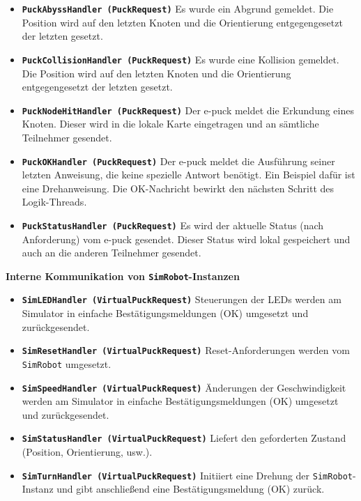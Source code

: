 \documentclass[10pt,a4paper]{article}
\begin{document}
			\begin{itemize}
				\item \textbf{\texttt{PuckAbyssHandler (PuckRequest)}} Es wurde ein Abgrund gemeldet. Die Position wird auf den letzten Knoten und die
					Orientierung entgegengesetzt der letzten gesetzt.
				\item \textbf{\texttt{PuckCollisionHandler (PuckRequest)}} Es wurde eine Kollision gemeldet. Die Position wird auf den letzten Knoten und die
					Orientierung entgegengesetzt der letzten gesetzt.					
				\item \textbf{\texttt{PuckNodeHitHandler (PuckRequest)}} Der e-puck meldet die Erkundung eines Knoten. Dieser wird in die lokale Karte
					eingetragen und an sämtliche Teilnehmer gesendet.
				\item \textbf{\texttt{PuckOKHandler (PuckRequest)}} Der e-puck meldet die Ausführung seiner letzten Anweisung, die keine spezielle Antwort
					benötigt. Ein Beispiel dafür ist eine Drehanweisung. Die OK-Nachricht bewirkt den nächsten Schritt des Logik-Threads.
				\item \textbf{\texttt{PuckStatusHandler (PuckRequest)}} Es wird der aktuelle Status (nach Anforderung) vom e-puck gesendet. Dieser Status wird
					lokal gespeichert und auch an die anderen Teilnehmer gesendet.
			\end{itemize} 
		 	\textbf{Interne Kommunikation von \texttt{SimRobot}-Instanzen}
			\begin{itemize}
				\item \textbf{\texttt{SimLEDHandler (VirtualPuckRequest)}} Steuerungen der LEDs werden am Simulator in einfache Bestätigungsmeldungen (OK)
					umgesetzt und zurückgesendet.
				\item \textbf{\texttt{SimResetHandler (VirtualPuckRequest)}} Reset-Anforderungen werden vom \texttt{SimRobot} umgesetzt.
				\item \textbf{\texttt{SimSpeedHandler (VirtualPuckRequest)}} Änderungen der Geschwindigkeit werden am Simulator in einfache Bestätigungsmeldungen
					(OK) umgesetzt und zurückgesendet.
				\item \textbf{\texttt{SimStatusHandler (VirtualPuckRequest)}} Liefert den geforderten Zustand (Position, Orientierung, usw.).
				\item \textbf{\texttt{SimTurnHandler (VirtualPuckRequest)}} Initiiert eine Drehung der \texttt{SimRobot}-Instanz und gibt anschließend eine
					Bestätigungsmeldung (OK) zurück.																		
			\end{itemize}  		
			
\end{document}
